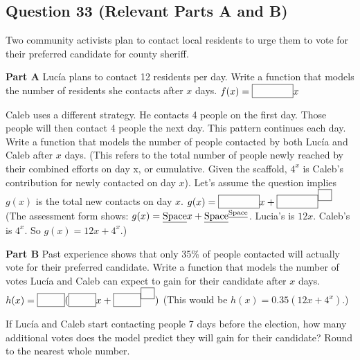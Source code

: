 \documentclass[12pt]{article}
\begin{document}
\subsection*{Question 33 (Relevant Parts A and B)}
Two community activists plan to contact local residents to urge them to vote for their preferred candidate for county sheriff.

\textbf{Part A} Lucía plans to contact 12 residents per day. Write a function that models the number of residents she contacts after \(x\) days.
\( f(x) = \framebox[1.5cm]{\phantom{X}} x \)

Caleb uses a different strategy. He contacts 4 people on the first day. Those people will then contact 4 people the next day. This pattern continues each day. Write a function that models the number of people contacted by both Lucía and Caleb after \(x\) days. (This refers to the total number of people newly reached by their combined efforts on day x, or cumulative. Given the scaffold, \(4^x\) is Caleb's contribution for newly contacted on day \(x\)).
Let's assume the question implies \(g(x)\) is the total new contacts on day \(x\).
\( g(x) = \framebox[1.5cm]{\phantom{X}} x + \framebox[1.5cm]{\phantom{X}}^{\text{\framebox[0.5cm]{\phantom{X}}}} \)
(The assessment form shows: \(g(x) = \text{\underline{Space}} x + \text{\underline{Space}}^{\text{\underline{Space}}}\). Lucia's is \(12x\). Caleb's is \(4^x\). So \(g(x) = 12x + 4^x\).)

\textbf{Part B} Past experience shows that only 35\% of people contacted will actually vote for their preferred candidate. Write a function that models the number of votes Lucía and Caleb can expect to gain for their candidate after \(x\) days.
\( h(x) = \text{\framebox[1cm]{\phantom{X}}} ( \text{\framebox[1cm]{\phantom{X}}} x + \text{\framebox[1cm]{\phantom{X}}}^{\text{\framebox[0.5cm]{\phantom{X}}}} ) \)
(This would be \(h(x) = 0.35(12x+4^x)\).)

If Lucía and Caleb start contacting people 7 days before the election, how many additional votes does the model predict they will gain for their candidate? Round to the nearest whole number.
\framebox[2cm]{\phantom{Number}}

\end{document}
